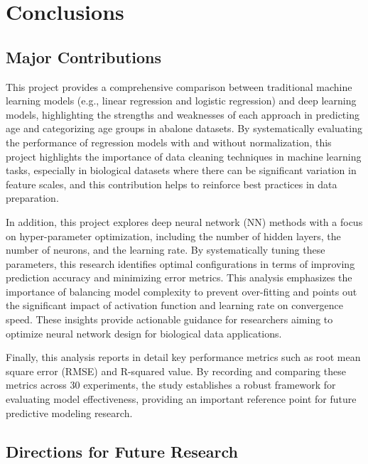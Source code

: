 \documentclass[conference]{IEEEtran}
\begin{document}
\section{Conclusions}
\subsection{Major Contributions}

This project provides a comprehensive comparison between traditional machine learning models (e.g., linear regression and logistic regression) and deep learning models, highlighting the strengths and weaknesses of each approach in predicting age and categorizing age groups in abalone datasets. By systematically evaluating the performance of regression models with and without normalization, this project highlights the importance of data cleaning techniques in machine learning tasks, especially in biological datasets where there can be significant variation in feature scales, and this contribution helps to reinforce best practices in data preparation.

In addition, this project explores deep neural network (NN) methods with a focus on hyper-parameter optimization, including the number of hidden layers, the number of neurons, and the learning rate. By systematically tuning these parameters, this research identifies optimal configurations in terms of improving prediction accuracy and minimizing error metrics. This analysis emphasizes the importance of balancing model complexity to prevent over-fitting and points out the significant impact of activation function and learning rate on convergence speed. These insights provide actionable guidance for researchers aiming to optimize neural network design for biological data applications.

Finally, this analysis reports in detail key performance metrics such as root mean square error (RMSE) and R-squared value. By recording and comparing these metrics across 30 experiments, the study establishes a robust framework for evaluating model effectiveness, providing an important reference point for future predictive modeling research.

\subsection{Directions for Future Research}
\end{document}
